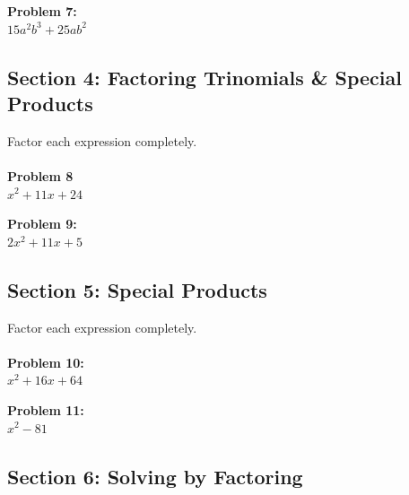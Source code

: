 \documentclass[12pt]{article}
\begin{document}
            \vspace{4cm}
            
            \textbf{Problem 7:}\\
            
            $15a^2b^3 + 25ab^2$
            
            \newpage

        \subsection*{Section 4: Factoring Trinomials \& Special Products}
            
            Factor each expression completely.\\\\
            
            \textbf{Problem 8}\\
            
            $x^2 + 11x + 24$
            
            \vspace{4cm}
            
            \textbf{Problem 9:}\\
            
            $2x^2 + 11x + 5$

			\newpage

		\subsection*{Section 5: Special Products}
            
            Factor each expression completely.\\\\
            
            \textbf{Problem 10:}\\
            
            $x^2 + 16x + 64$
            
            \vspace{4cm}
            
            \textbf{Problem 11:}\\
            
            $x^2 - 81$
            
            \newpage

        \subsection*{Section 6: Solving by Factoring}
            
\end{document}
